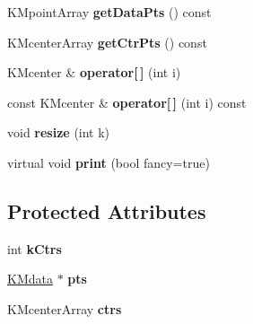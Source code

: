 \begin{DoxyCompactItemize}
\item 
\hypertarget{class_k_mcenters_a0c397ae473520b0ba093c16f6bcfc9f8}{
KMpointArray {\bfseries getDataPts} () const }
\label{class_k_mcenters_a0c397ae473520b0ba093c16f6bcfc9f8}

\item 
\hypertarget{class_k_mcenters_ac435c9b28c9dffad3b4d44ff59f3c50f}{
KMcenterArray {\bfseries getCtrPts} () const }
\label{class_k_mcenters_ac435c9b28c9dffad3b4d44ff59f3c50f}

\item 
\hypertarget{class_k_mcenters_a6b0d81e3508b3e6e89eb6dc869000679}{
KMcenter \& {\bfseries operator\mbox{[}$\,$\mbox{]}} (int i)}
\label{class_k_mcenters_a6b0d81e3508b3e6e89eb6dc869000679}

\item 
\hypertarget{class_k_mcenters_a395c5699c4da5690e1421a55327b6253}{
const KMcenter \& {\bfseries operator\mbox{[}$\,$\mbox{]}} (int i) const }
\label{class_k_mcenters_a395c5699c4da5690e1421a55327b6253}

\item 
\hypertarget{class_k_mcenters_ac9fe3a5aac9dcdf647a2b3116bd9d3db}{
void {\bfseries resize} (int k)}
\label{class_k_mcenters_ac9fe3a5aac9dcdf647a2b3116bd9d3db}

\item 
\hypertarget{class_k_mcenters_a5354e74cd265f703c7a36fe55a7a0019}{
virtual void {\bfseries print} (bool fancy=true)}
\label{class_k_mcenters_a5354e74cd265f703c7a36fe55a7a0019}

\end{DoxyCompactItemize}
\subsection*{Protected Attributes}
\begin{DoxyCompactItemize}
\item 
\hypertarget{class_k_mcenters_ac61c6470f7871f173c741060f4ee87b4}{
int {\bfseries kCtrs}}
\label{class_k_mcenters_ac61c6470f7871f173c741060f4ee87b4}

\item 
\hypertarget{class_k_mcenters_a4ad2698dccf53cf0102004dfef5fb5a6}{
\hyperlink{class_k_mdata}{KMdata} $\ast$ {\bfseries pts}}
\label{class_k_mcenters_a4ad2698dccf53cf0102004dfef5fb5a6}

\item 
\hypertarget{class_k_mcenters_acba206c495269438c365b76b57dba5cc}{
KMcenterArray {\bfseries ctrs}}
\label{class_k_mcenters_acba206c495269438c365b76b57dba5cc}

\end{DoxyCompactItemize}


